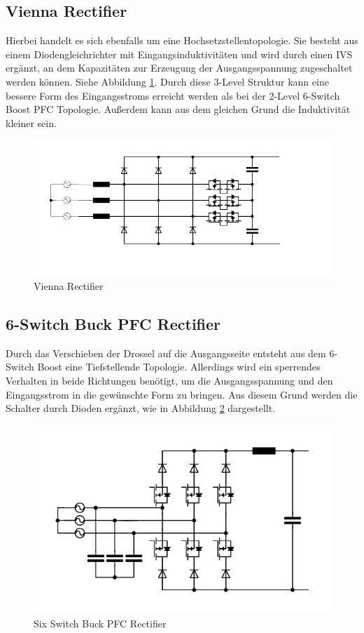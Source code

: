 	\subsection{Vienna Rectifier}
		Hierbei handelt es sich ebenfalls um eine Hochsetzstellentopologie. Sie besteht aus einem Diodengleichrichter mit Eingangsinduktivitäten und wird durch einen \gls{IVS} ergänzt, an dem Kapazitäten zur Erzeugung der Ausgangsspannung zugeschaltet werden können. Siehe Abbildung \ref{fig:vienna}. Durch diese 3-Level Struktur kann eine bessere Form des Eingangsstroms erreicht werden als bei der 2-Level 6-Switch Boost PFC Topologie. Außerdem kann aus dem gleichen Grund die Induktivität kleiner sein.
		\begin{figure}[H]
			\centering
			\includegraphics[width=0.9\linewidth]{content/Grafiken/Vienna}
			\caption{Vienna Rectifier}
			\label{fig:vienna}
		\end{figure}
		
	\subsection{6-Switch Buck PFC Rectifier}
		Durch das Verschieben der Drossel auf die Ausgangsseite entsteht aus dem 6-Switch Boost eine Tiefstellende Topologie. Allerdings wird ein sperrendes Verhalten in beide Richtungen benötigt, um die Ausgangsspannung und den Eingangsstrom in die gewünschte Form zu bringen. Aus diesem Grund werden die Schalter durch Dioden ergänzt, wie in Abbildung \ref{fig:sixswitchbuck} dargestellt.  
		
		\begin{figure}[H]
			\centering
			\includegraphics[width=0.9\linewidth]{content/Grafiken/SixSwitchBuck}
			\caption{Six Switch Buck PFC Rectifier}
			\label{fig:sixswitchbuck}
		\end{figure}
	
